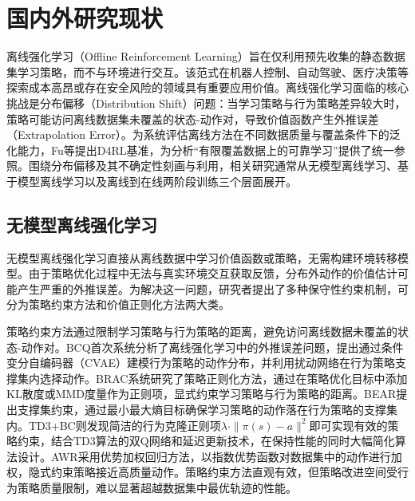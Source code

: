 \section{国内外研究现状}\label{Sec1.2}

离线强化学习（Offline Reinforcement Learning）旨在仅利用预先收集的静态数据集学习策略，而不与环境进行交互\cite{Levine2020OfflineRL}。该范式在机器人控制\cite{Johannink2019Residual}、自动驾驶\cite{Kiran2022Driving}、医疗决策\cite{Gottesman2019Healthcare}等探索成本高昂或存在安全风险的领域具有重要应用价值。离线强化学习面临的核心挑战是分布偏移（Distribution Shift）问题\cite{Fujimoto2019BCQ}：当学习策略与行为策略差异较大时，策略可能访问离线数据集未覆盖的状态-动作对，导致价值函数产生外推误差（Extrapolation Error）\cite{Liu2020Provably}。为系统评估离线方法在不同数据质量与覆盖条件下的泛化能力，Fu等\cite{Fu2020D4RL}提出D4RL基准，为分析“有限覆盖数据上的可靠学习”提供了统一参照。围绕分布偏移及其不确定性刻画与利用，相关研究通常从无模型离线学习、基于模型离线学习以及离线到在线两阶段训练三个层面展开。


\subsection{无模型离线强化学习}\label{Sec1.2.1}

无模型离线强化学习直接从离线数据中学习价值函数或策略，无需构建环境转移模型。由于策略优化过程中无法与真实环境交互获取反馈，分布外动作的价值估计可能产生严重的外推误差\cite{Fujimoto2019BCQ}。为解决这一问题，研究者提出了多种保守性约束机制，可分为策略约束方法和价值正则化方法两大类\cite{Wu2019BRAC,Xu2022PGIS,Kumar2019BEAR,Lyu2022MCQ,Kostrikov2022IQL}。

策略约束方法通过限制学习策略与行为策略的距离，避免访问离线数据未覆盖的状态-动作对。BCQ\cite{Fujimoto2019BCQ}首次系统分析了离线强化学习中的外推误差问题，提出通过条件变分自编码器（CVAE）建模行为策略的动作分布，并利用扰动网络在行为策略支撑集内选择动作。BRAC\cite{Wu2019BRAC}系统研究了策略正则化方法，通过在策略优化目标中添加KL散度或MMD度量作为正则项，显式约束学习策略与行为策略的距离。BEAR\cite{Kumar2019BEAR}提出支撑集约束，通过最小最大熵目标确保学习策略的动作落在行为策略的支撑集内。TD3+BC\cite{Fujimoto2021TD3BC}则发现简洁的行为克隆正则项$\lambda \cdot \|\pi(s) - a\|^2$即可实现有效的策略约束，结合TD3算法\cite{Fujimoto2018TD3}的双Q网络和延迟更新技术，在保持性能的同时大幅简化算法设计。AWR\cite{Peng2019AWR}采用优势加权回归方法，以指数优势函数对数据集中的动作进行加权，隐式约束策略接近高质量动作。策略约束方法直观有效，但策略改进空间受行为策略质量限制，难以显著超越数据集中最优轨迹的性能。

